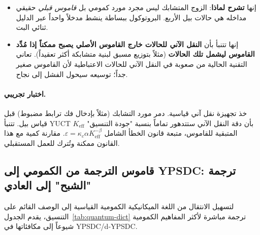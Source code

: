 \documentclass[12pt,a4paper]{article}
\theoremstyle{remark}
\begin{document}
	\begin{itemize}
		\item إنها \textbf{تشرح لماذا}: الزوج المتشابك ليس مجرد مورد كمومي بل \emph{قاموس قبلي} حقيقي مداخله هي حالات بيل الأربع. البروتوكول ببساطة ينشط مدخلاً واحداً عبر الدليل ثنائي البت.
		\item إنها تتنبأ بأن \textbf{النقل الآني للحالات خارج القاموس الأصلي يصبح ممكناً إذا مُدِّد القاموس ليشمل تلك الحالات} (مثلاً بتوزيع مسبق لبنية متشابكة أكثر تعقيداً). تعاني التقنية الحالية من صعوبة في النقل الآني للحالات الاعتباطية لأن القاموس صغير جداً؛ توسيعه سيحول الفشل إلى نجاح.
	\end{itemize}
	
	\paragraph{اختبار تجريبي.}
	خذ تجهيزة نقل آني قياسية. دمر مورد التشابك (مثلاً بإدخال فك ترابط مضبوط) قبل قياس بيل. تتنبأ YUCT بأن دقة النقل الآني ستتدهور تماماً بنسبة "جودة التنسيق" \(K_{\mathrm{eff}}\) المتبقية للقاموس، متبعة قانون الخطأ الشامل \(\varepsilon = \kappa_c \alpha K_{\mathrm{eff}}^{-\beta}\). مقارنة كمية مع هذا القانون ممكنة وتُترك للعمل المستقبلي.
	
	\subsection{قاموس الترجمة من الكمومي إلى YPSDC: ترجمة "الشبح" إلى العادي}
	
	لتسهيل الانتقال من اللغة الميكانيكية الكمومية القياسية إلى الوصف القائم على التنسيق، يقدم الجدول~\ref{tab:quantum-dict} ترجمة مباشرة لأكثر المفاهيم الكمومية شيوعاً إلى مكافئاتها في YPSDC/d‑YPSDC.
	
\end{document}
